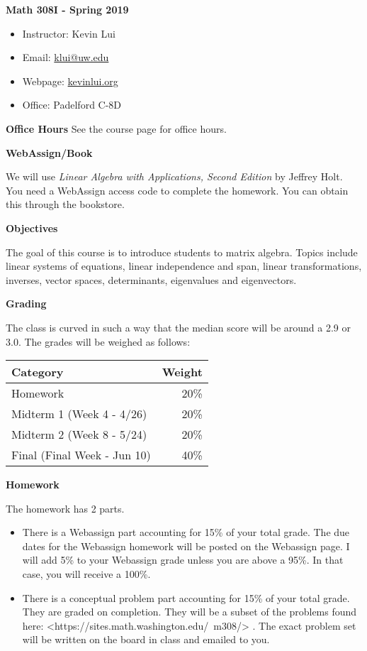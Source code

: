 \documentclass{article}
\begin{document}
\textbf{\huge  Math 308I - Spring 2019}
\begin{itemize}
    \item
        Instructor: Kevin Lui
    \item
        Email: \href{mailto:klui@uw.edu}{klui@uw.edu}
    \item
        Webpage: \url{kevinlui.org}
    \item
        Office: Padelford C-8D
\end{itemize}

\textbf{Office Hours}
See the course page for office hours.

\textbf{WebAssign/Book}

We will use \textit{Linear Algebra with Applications, Second Edition} by
Jeffrey Holt. You need a WebAssign access code to complete the homework. You
can obtain this through the bookstore.

\textbf{Objectives}

The goal of this course is to introduce students to matrix algebra. Topics
include linear systems of equations, linear independence and span, linear
transformations, inverses, vector spaces, determinants, eigenvalues and
eigenvectors.

\textbf{Grading}

The class is curved in such a way that the median score will be around a 2.9 or
3.0. The grades will be weighed as follows:

\begin{tabular}{ l r }
    Category  & Weight   \\
    \hline
    Homework  & 20\%      \\
    Midterm 1 (Week 4 - 4/26) & 20\%      \\
    Midterm 2 (Week 8 - 5/24) & 20\%      \\
    Final (Final Week - Jun 10)    & 40\%
\end{tabular}

\textbf{Homework}

The homework has 2 parts.
\begin{itemize}
    \item 
        There is a Webassign part accounting for 15\%  of your total grade.
        The due dates for the Webassign homework will be posted on the
        Webassign page. I will add 5\% to your Webassign grade unless you are
        above a 95\%. In that case, you will receive a 100\%.
    \item
        There is a conceptual problem part accounting for 15\% of your total
        grade. They are graded on completion. They will be a subset of the
        problems found here: <https://sites.math.washington.edu/~m308/> . The
        exact problem set will be written on the board in class and emailed to
        you.
\end{itemize}
\end{document}
